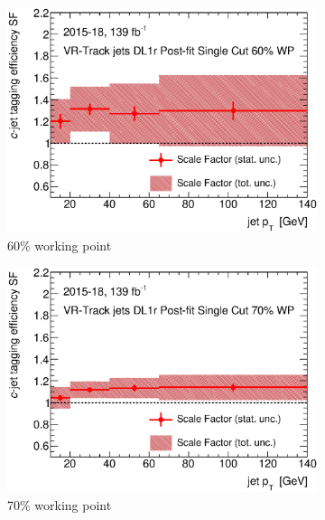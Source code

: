 \documentclass[letterpaper,12pt]{article}
\begin{document}
\begin{figure}[H]
	\centering
	\begin{subfigure}[t]{.35\linewidth}
		\includegraphics[width=1\textwidth]{FTAG_plots/DL1rallVRJetsDec/SF60.eps}
		\caption{60\% working point}
			\end{subfigure}
		\begin{subfigure}[t]{.35\linewidth}
			\includegraphics[width=1\textwidth]{FTAG_plots/DL1rallVRJetsDec/SF70.eps}
			\caption{70\% working point}
		\end{subfigure}
		\begin{subfigure}[t]{.35\linewidth}

\end{subfigure}
\end{figure}
\end{document}

